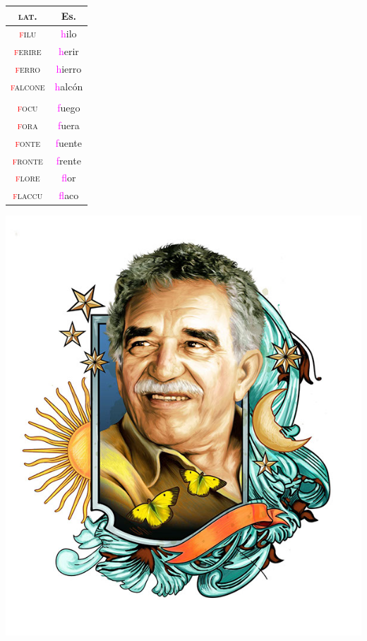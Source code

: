\documentclass{report}[12pt]
\begin{document}
\begin{tabular}{c c}
  \textsc{lat.} & Es. \\
  \hline
  \textsc{\textcolor{red}{f}ilu} & \textcolor{magenta}{h}ilo \\
  \textsc{\textcolor{red}{f}erire} & \textcolor{magenta}{h}erir \\
  \textsc{\textcolor{red}{f}erro} & \textcolor{magenta}{h}ierro \\
  \textsc{\textcolor{red}{f}alcone} & \textcolor{magenta}{h}alcón \\
                & \\
  \textsc{\textcolor{red}{f}ocu} & \textcolor{magenta}{f}uego \\
  \textsc{\textcolor{red}{f}ora} & \textcolor{magenta}{f}uera \\
  \textsc{\textcolor{red}{f}onte} & \textcolor{magenta}{f}uente \\
  \textsc{\textcolor{red}{f}ronte} & \textcolor{magenta}{f}rente \\
  \textsc{\textcolor{red}{f}lore} & \textcolor{magenta}{f}lor \\
  \textsc{\textcolor{red}{f}laccu} & \textcolor{magenta}{f}laco \\
\end{tabular}

\pagebreak

\includegraphics[scale=0.75]{marquez.jpg}
\end{document}
